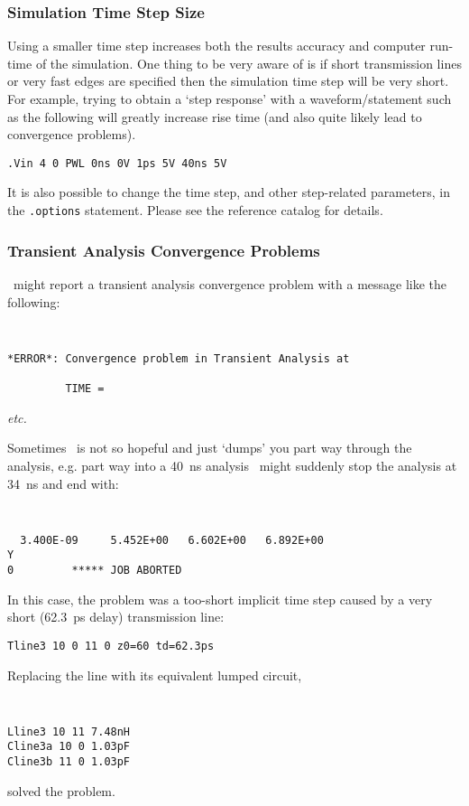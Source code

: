 \subsubsection{Simulation Time Step Size}

Using a smaller time step increases both the results accuracy and computer
run-time of the simulation.  One thing to be very aware of is if short
transmission lines or very fast edges are specified
then the simulation time step will be very short.
For example, trying to
obtain a `step response' with a waveform/statement such as the
following will greatly increase rise time (and also quite likely
lead to convergence problems).
\centerline{}
\par\noindent
\begin{center}
{\tt .Vin 4 0 PWL 0ns 0V 1ps 5V 40ns 5V}
\end{center}
It is also possible to change the
time step, and other step-related parameters, in the {\tt .options}
statement.  Please see the reference catalog for details.

\subsubsection{Transient Analysis Convergence Problems}
\label{transconv}

\spice\ might report a transient analysis convergence problem with
a message like the following:
\begin{center}
{\tt
\begin{verbatim}
*ERROR*: Convergence problem in Transient Analysis at

         TIME =

\end{verbatim} }
{\em etc.}
\end{center}
\par\noindent
Sometimes \spice\ is not so hopeful and just `dumps' you part way
through the analysis, e.g. part way into a 40~ns analysis \spice\
might suddenly stop the analysis at 34~ns and end with:
\begin{center}
{\tt
\begin{verbatim}
  3.400E-09     5.452E+00   6.602E+00   6.892E+00
Y
0         ***** JOB ABORTED
\end{verbatim}
}
\end{center}
In this case, the problem was a too-short implicit time step caused
by a very short (62.3~ps delay) transmission line:
\begin{center}
{\tt Tline3 10 0 11 0 z0=60 td=62.3ps}
\end{center}
Replacing the line with its equivalent lumped circuit,
\begin{center}
{\tt
\begin{verbatim}
Lline3 10 11 7.48nH
Cline3a 10 0 1.03pF
Cline3b 11 0 1.03pF
\end{verbatim}
}
\end{center}
solved the problem.


